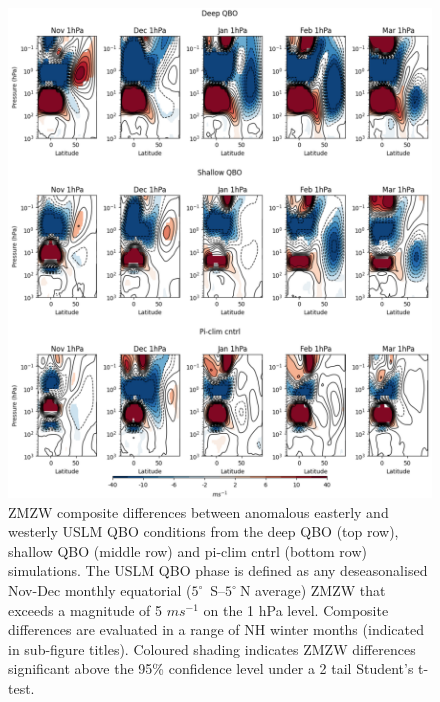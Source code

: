 \begin{figure}[h!]
\begin{center}
\noindent\includegraphics[width = 0.8\linewidth]{Figures/Figures-deepQBO/SAO_composites_combined.png}
\caption[ZMZW composites under easterly and westerly SAO anomalies]{ZMZW composite differences between anomalous easterly and westerly USLM QBO conditions from the deep QBO (top row), shallow QBO (middle row) and pi-clim cntrl (bottom row) simulations. The USLM QBO phase is defined as any deseasonalised Nov-Dec monthly equatorial ($5^{\circ}$\ S--$5^{\circ}\ $N average) ZMZW that exceeds a magnitude of 5 $ms^{-1}$ on the 1 hPa level. Composite differences are evaluated in a range of NH winter months (indicated in sub-figure titles). Coloured shading indicates ZMZW differences significant above the 95\% confidence level under a 2 tail Student’s t-test.}
\label{fig:SAO_comp_1hPa}
\end{center}
\end{figure}



